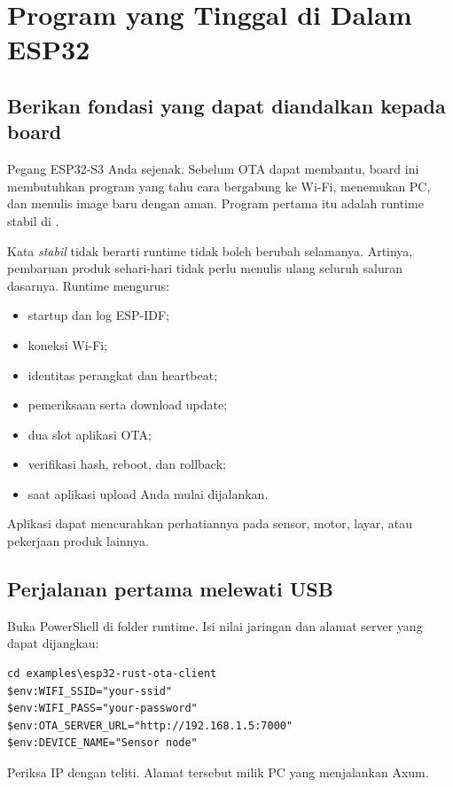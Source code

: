 \chapter{Program yang Tinggal di Dalam ESP32}

\section{Berikan fondasi yang dapat diandalkan kepada board}

Pegang ESP32-S3 Anda sejenak. Sebelum OTA dapat membantu, board ini membutuhkan program yang tahu cara bergabung ke Wi-Fi, menemukan PC, dan menulis image baru dengan aman. Program pertama itu adalah runtime stabil di .

Kata \emph{stabil} tidak berarti runtime tidak boleh berubah selamanya. Artinya, pembaruan produk sehari-hari tidak perlu menulis ulang seluruh saluran dasarnya. Runtime mengurus:

\begin{itemize}
  \item startup dan log ESP-IDF;
  \item koneksi Wi-Fi;
  \item identitas perangkat dan heartbeat;
  \item pemeriksaan serta download update;
  \item dua slot aplikasi OTA;
  \item verifikasi hash, reboot, dan rollback;
  \item saat aplikasi upload Anda mulai dijalankan.
\end{itemize}

Aplikasi dapat mencurahkan perhatiannya pada sensor, motor, layar, atau pekerjaan produk lainnya.

\section{Perjalanan pertama melewati USB}

Buka PowerShell di folder runtime. Isi nilai jaringan dan alamat server yang dapat dijangkau:

\begin{lstlisting}
cd examples\esp32-rust-ota-client
$env:WIFI_SSID="your-ssid"
$env:WIFI_PASS="your-password"
$env:OTA_SERVER_URL="http://192.168.1.5:7000"
$env:DEVICE_NAME="Sensor node"
\end{lstlisting}

Periksa IP dengan teliti. Alamat tersebut milik PC yang menjalankan Axum.


